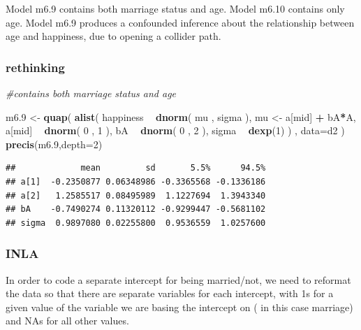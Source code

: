\documentclass[
]{article}
\newenvironment{Shaded}{\begin{snugshade}}{\end{snugshade}}
\newcommand{\CommentTok}[1]{\textcolor[rgb]{0.56,0.35,0.01}{\textit{#1}}}
\newcommand{\DataTypeTok}[1]{\textcolor[rgb]{0.13,0.29,0.53}{#1}}
\newcommand{\DecValTok}[1]{\textcolor[rgb]{0.00,0.00,0.81}{#1}}
\newcommand{\FloatTok}[1]{\textcolor[rgb]{0.00,0.00,0.81}{#1}}
\newcommand{\KeywordTok}[1]{\textcolor[rgb]{0.13,0.29,0.53}{\textbf{#1}}}
\newcommand{\NormalTok}[1]{#1}
\newcommand{\OperatorTok}[1]{\textcolor[rgb]{0.81,0.36,0.00}{\textbf{#1}}}
\newcommand{\StringTok}[1]{\textcolor[rgb]{0.31,0.60,0.02}{#1}}
\begin{document}
Model m6.9 contains both marriage status and age. Model m6.10 contains
only age. Model m6.9 produces a confounded inference about the
relationship between age and happiness, due to opening a collider path.

\hypertarget{rethinking}{%
\subsubsection{rethinking}\label{rethinking}}

\begin{Shaded}
\begin{Highlighting}[]
\CommentTok{#contains both marriage status and age}

\NormalTok{m6}\FloatTok{.9}\NormalTok{ <-}\StringTok{ }\KeywordTok{quap}\NormalTok{(}
    \KeywordTok{alist}\NormalTok{(}
\NormalTok{        happiness }\OperatorTok{~}\StringTok{ }\KeywordTok{dnorm}\NormalTok{( mu , sigma ),}
\NormalTok{        mu <-}\StringTok{ }\NormalTok{a[mid] }\OperatorTok{+}\StringTok{ }\NormalTok{bA}\OperatorTok{*}\NormalTok{A,}
\NormalTok{        a[mid] }\OperatorTok{~}\StringTok{ }\KeywordTok{dnorm}\NormalTok{( }\DecValTok{0}\NormalTok{ , }\DecValTok{1}\NormalTok{ ),}
\NormalTok{        bA }\OperatorTok{~}\StringTok{ }\KeywordTok{dnorm}\NormalTok{( }\DecValTok{0}\NormalTok{ , }\DecValTok{2}\NormalTok{ ),}
\NormalTok{        sigma }\OperatorTok{~}\StringTok{ }\KeywordTok{dexp}\NormalTok{(}\DecValTok{1}\NormalTok{)}
\NormalTok{    ) , }\DataTypeTok{data=}\NormalTok{d2 )}
\KeywordTok{precis}\NormalTok{(m6}\FloatTok{.9}\NormalTok{,}\DataTypeTok{depth=}\DecValTok{2}\NormalTok{)}
\end{Highlighting}
\end{Shaded}

\begin{verbatim}
##             mean         sd       5.5%      94.5%
## a[1]  -0.2350877 0.06348986 -0.3365568 -0.1336186
## a[2]   1.2585517 0.08495989  1.1227694  1.3943340
## bA    -0.7490274 0.11320112 -0.9299447 -0.5681102
## sigma  0.9897080 0.02255800  0.9536559  1.0257600
\end{verbatim}

\hypertarget{inla}{%
\subsubsection{INLA}\label{inla}}

In order to code a separate intercept for being married/not, we need to
reformat the data so that there are separate variables for each
intercept, with 1s for a given value of the variable we are basing the
intercept on ( in this case marriage) and NAs for all other values.
\end{document}

